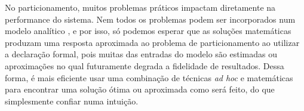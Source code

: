       No particionamento, muitos problemas práticos impactam diretamente na performance do sistema.
      Nem todos os problemas podem ser incorporados num modelo analítico \cite{Wang2016}, e por isso, só podemos esperar que as soluções matemáticas produzam uma resposta aproximada ao problema de particionamento ao utilizar a declaração formal, pois muitas das entradas do modelo são estimadas ou aproximações no qual futuramente degrada a fidelidade de resultados.
      Dessa forma, é mais eficiente usar uma combinação de técnicas \textit{ad hoc} e matemáticas para encontrar uma solução ótima ou aproximada como será feito, do que simplesmente confiar numa intuição.


